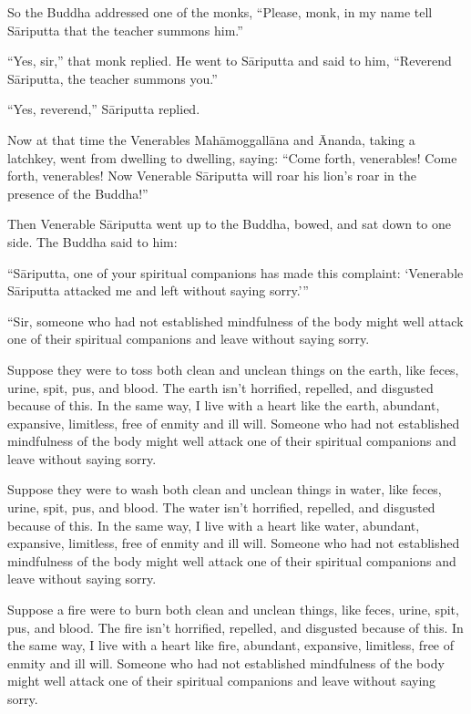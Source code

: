 \documentclass[12pt,openany]{book}%
\begin{document}
So the Buddha addressed one of the monks, “Please, monk, in my name tell \textsanskrit{Sāriputta} that the teacher summons him.” 

“Yes, sir,” that monk replied. He went to \textsanskrit{Sāriputta} and said to him, “Reverend \textsanskrit{Sāriputta}, the teacher summons you.” 

“Yes, reverend,” \textsanskrit{Sāriputta} replied. 

Now at that time the Venerables \textsanskrit{Mahāmoggallāna} and Ānanda, taking a latchkey, went from dwelling to dwelling, saying: “Come forth, venerables! Come forth, venerables! Now Venerable \textsanskrit{Sāriputta} will roar his lion’s roar in the presence of the Buddha!” 

Then Venerable \textsanskrit{Sāriputta} went up to the Buddha, bowed, and sat down to one side. The Buddha said to him: 

“\textsanskrit{Sāriputta}, one of your spiritual companions has made this complaint: ‘Venerable \textsanskrit{Sāriputta} attacked me and left without saying sorry.’” 

“Sir, someone who had not established mindfulness of the body might well attack one of their spiritual companions and leave without saying sorry. 

Suppose they were to toss both clean and unclean things on the earth, like feces, urine, spit, pus, and blood. The earth isn’t horrified, repelled, and disgusted because of this. In the same way, I live with a heart like the earth, abundant, expansive, limitless, free of enmity and ill will. Someone who had not established mindfulness of the body might well attack one of their spiritual companions and leave without saying sorry. 

Suppose they were to wash both clean and unclean things in water, like feces, urine, spit, pus, and blood. The water isn’t horrified, repelled, and disgusted because of this. In the same way, I live with a heart like water, abundant, expansive, limitless, free of enmity and ill will. Someone who had not established mindfulness of the body might well attack one of their spiritual companions and leave without saying sorry. 

Suppose a fire were to burn both clean and unclean things, like feces, urine, spit, pus, and blood. The fire isn’t horrified, repelled, and disgusted because of this. In the same way, I live with a heart like fire, abundant, expansive, limitless, free of enmity and ill will. Someone who had not established mindfulness of the body might well attack one of their spiritual companions and leave without saying sorry. 
\end{document}
